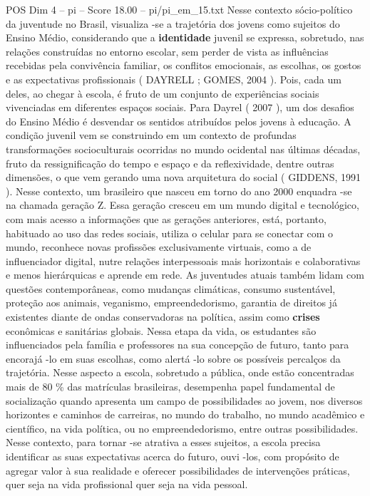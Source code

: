 \begin{textsample}{POS Dim 4 – pi – Score 18.00 – pi/pi\_em\_15.txt}
Nesse contexto sócio-político da juventude no Brasil, visualiza -se a trajetória dos jovens como sujeitos do Ensino Médio, considerando que a \textbf{identidade} juvenil se expressa, sobretudo, nas relações construídas no entorno escolar, sem perder de vista as influências recebidas pela convivência familiar, os conflitos emocionais, as escolhas, os gostos e as expectativas profissionais ( DAYRELL ; GOMES, 2004 ).
Pois, cada um deles, ao chegar à escola, é fruto de um conjunto de experiências sociais vivenciadas em diferentes espaços sociais.
Para Dayrel ( 2007 ), um dos desafios do Ensino Médio é desvendar os sentidos atribuídos pelos jovens à educação.
A condição juvenil vem se construindo em um contexto de profundas transformações socioculturais ocorridas no mundo ocidental nas últimas décadas, fruto da ressignificação do tempo e espaço e da reflexividade, dentre outras dimensões, o que vem gerando uma nova arquitetura do social ( GIDDENS, 1991 ).
Nesse contexto, um brasileiro que nasceu em torno do ano 2000 enquadra -se na chamada geração Z.
Essa geração cresceu em um mundo digital e tecnológico, com mais acesso a informações que as gerações anteriores, está, portanto, habituado ao uso das redes sociais, utiliza o celular para se conectar com o mundo, reconhece novas profissões exclusivamente virtuais, como a de influenciador digital, nutre relações interpessoais mais horizontais e colaborativas e menos hierárquicas e aprende em rede.
As juventudes atuais também lidam com questões contemporâneas, como mudanças climáticas, consumo sustentável, proteção aos animais, veganismo, empreendedorismo, garantia de direitos já existentes diante de ondas conservadoras na política, assim como \textbf{crises} econômicas e sanitárias globais.
Nessa etapa da vida, os estudantes são influenciados pela família e professores na sua concepção de futuro, tanto para encorajá -lo em suas escolhas, como alertá -lo sobre os possíveis percalços da trajetória.
Nesse aspecto a escola, sobretudo a pública, onde estão concentradas mais de 80 \% das matrículas brasileiras, desempenha papel fundamental de socialização quando apresenta um campo de possibilidades ao jovem, nos diversos horizontes e caminhos de carreiras, no mundo do trabalho, no mundo acadêmico e científico, na vida política, ou no empreendedorismo, entre outras possibilidades.
Nesse contexto, para tornar -se atrativa a esses sujeitos, a escola precisa identificar as suas expectativas acerca do futuro, ouvi -los, com propósito de agregar valor à sua realidade e oferecer possibilidades de intervenções práticas, quer seja na vida profissional quer seja na vida pessoal.

\end{textsample}
